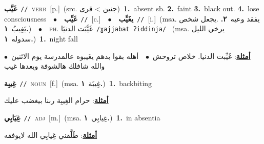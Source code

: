 \documentclass[10pt,a4paper,twoside]{article} %
\begin{document}
\begin{multicols}{2}
{\setlength\topsep{0pt}\textbf{\foreignlanguage{arabic}{غَيَّب}}\ {\color{gray}\texttt{//}\color{black}}\ \textsc{verb}\ [p.]\ (src. \color{gray}\foreignlanguage{arabic}{جنين > قرى}\color{black})\ \textbf{1.}~absent sb.  \textbf{2.}~faint  \textbf{3.}~black out.  \textbf{4.}~lose consciousness\ \ $\bullet$\ \ \setlength\topsep{0pt}\textbf{\foreignlanguage{arabic}{غَيِّب}}\ {\color{gray}\texttt{//}\color{black}}\ [c.]\ \ $\bullet$\ \ \setlength\topsep{0pt}\textbf{\foreignlanguage{arabic}{يغَيِّب}}\ {\color{gray}\texttt{//}\color{black}}\ [i.]\ \color{gray}(msa. \foreignlanguage{arabic}{يفقد وعيه}~\foreignlanguage{arabic}{\textbf{٢.}}  .\foreignlanguage{arabic}{يجعل شخص يَغِيبُ}~\foreignlanguage{arabic}{\textbf{١.}})\color{black}\ \ $\bullet$\ \ \textsc{ph.} \color{gray} \foreignlanguage{arabic}{غَيَّبَت الدنيَا}\color{black}\ {\color{gray}\texttt{/{\sffamily ɣajjabat ʔiddinja}/}\color{black}}\ \color{gray} (msa. \foreignlanguage{arabic}{يرخي الليل سدوله}~\foreignlanguage{arabic}{\textbf{١.}})\color{black}\ \textbf{1.}~night fall\  \begin{flushright}\color{gray}\foreignlanguage{arabic}{\textbf{\underline{\foreignlanguage{arabic}{أمثلة}}}: غَيِّبت الدنيا. خلاص تروحش\ $\bullet$\ \  أهله بقوا بدهم يغَيبوه عالمدرسة يوم الاثنين\ $\bullet$\ \  والله شافلك هالشوفة وبعدها غيب}\end{flushright}\color{black}} \vspace{2mm}

{\setlength\topsep{0pt}\textbf{\foreignlanguage{arabic}{غِيبِة}}\ {\color{gray}\texttt{//}\color{black}}\ \textsc{noun}\ [f.]\ \color{gray}(msa. \foreignlanguage{arabic}{غِيبَة}~\foreignlanguage{arabic}{\textbf{١.}})\color{black}\ \textbf{1.}~backbiting\  \begin{flushright}\color{gray}\foreignlanguage{arabic}{\textbf{\underline{\foreignlanguage{arabic}{أمثلة}}}: حرام الغِيبِة ربنا بيغضب عليك}\end{flushright}\color{black}} \vspace{2mm}

{\setlength\topsep{0pt}\textbf{\foreignlanguage{arabic}{غِيَابِي}}\ {\color{gray}\texttt{//}\color{black}}\ \textsc{adj}\ [m.]\ \color{gray}(msa. \foreignlanguage{arabic}{غِيابِي}~\foreignlanguage{arabic}{\textbf{١.}})\color{black}\ \textbf{1.}~in absentia\  \begin{flushright}\color{gray}\foreignlanguage{arabic}{\textbf{\underline{\foreignlanguage{arabic}{أمثلة}}}: طَلَّقني غِيابِي الله لايوفقه}\end{flushright}\color{black}} \vspace{2mm}


\end{multicols}
\end{document}
